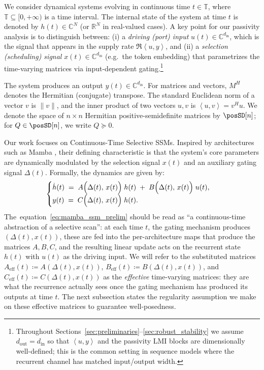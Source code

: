 \documentclass[10pt]{article} %
\def\eqref#1{equation~\ref{#1}}
\newcommand{\timeInt}{\mathbb T}                        %
\newcommand{\ip}[2]{\left\langle #1, #2 \right\rangle} %
\theoremstyle{definition}
\begin{document}
We consider dynamical systems evolving in continuous time $t \in \timeInt$, where $\timeInt \subseteq [0, +\infty)$ is a time interval. The internal state of the system at time $t$ is denoted by $h(t) \in \mathbb{C}^N$ (or $\mathbb{R}^N$ in real-valued cases).
A key point for our passivity analysis is to distinguish between:
(i) a \emph{driving (port) input} $u(t) \in \mathbb{C}^{d_{\mathrm{in}}}$, which is the signal that appears in the supply rate $\Re\ip{u}{y}$, and
(ii) a \emph{selection (scheduling) signal} $x(t) \in \mathbb{C}^{d_{\mathrm{in}}}$ (e.g.\ the token embedding) that parametrizes the time-varying matrices via input-dependent gating.\footnote{Throughout Sections~\ref{sec:preliminaries}--\ref{sec:robust_stability} we assume $d_{\mathrm{out}}=d_{\mathrm{in}}$ so that $\ip{u}{y}$ and the passivity LMI blocks are dimensionally well-defined; this is the common setting in sequence models where the recurrent channel has matched input/output width.}

The system produces an output $y(t) \in \mathbb{C}^{d_{\mathrm{in}}}$. For matrices and vectors, $M^H$ denotes the Hermitian (conjugate) transpose. The standard Euclidean norm of a vector $v$ is $\|v\|$, and the inner product of two vectors $u,v$ is $\ip{u}{v} = v^H u$. We denote the space of $n \times n$ Hermitian positive-semidefinite matrices by $\posSD[n]$; for $Q \in \posSD[n]$, we write $Q \succeq 0$.

Our work focuses on Continuous-Time Selective SSMs. Inspired by architectures such as Mamba \citep{gu2024mamba}, their defining characteristic is that the system's core parameters are dynamically modulated by the selection signal $x(t)$ and an auxiliary gating signal $\Delta(t)$. Formally, the dynamics are given by:
\begin{equation}
\label{eq:mamba_ssm_prelim}
\begin{cases}
  \dot{h}(t) \;=\; A\Bigl(\Delta(t),\,x(t)\Bigr)\;h(t)
  \;+\; B\Bigl(\Delta(t),\,x(t)\Bigr)\;u(t),\\
  y(t) \;=\; C\Bigl(\Delta(t),\,x(t)\Bigr)\;h(t).
\end{cases}
\end{equation}
The~\eqref{eq:mamba_ssm_prelim} should be read as ``a continuous-time abstraction of a selective scan'': at each time $t$, the gating mechanism produces $(\Delta(t),x(t))$, these are fed into the per-architecture maps that produce the matrices $A,B,C$, and the resulting linear update acts on the recurrent state $h(t)$ with $u(t)$ as the driving input. We will refer to the substituted matrices $A_{\mathrm{eff}}(t)\coloneqq A(\Delta(t),x(t))$, $B_{\mathrm{eff}}(t)\coloneqq B(\Delta(t),x(t))$, and $C_{\mathrm{eff}}(t)\coloneqq C(\Delta(t),x(t))$ as the \emph{effective} time-varying matrices: they are what the recurrence actually sees once the gating mechanism has produced its outputs at time $t$. The next subsection states the regularity assumption we make on these effective matrices to guarantee well-posedness.
\end{document}
